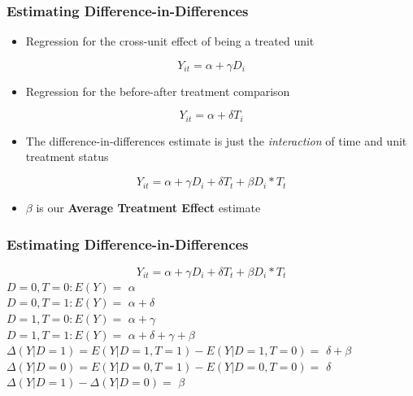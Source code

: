 \documentclass[xcolor=x11names,compress]{beamer}\usepackage[]{graphicx}\usepackage[]{color}
\renewcommand{\(}{\begin{columns}}
\renewcommand{\)}{\end{columns}}
\newcommand{\<}[1]{\begin{column}{#1}}
\renewcommand{\>}{\end{column}}
\begin{document}
\begin{frame}
\frametitle{Estimating Difference-in-Differences}
\begin{itemize}
\item Regression for the cross-unit effect of being a treated unit
\end{itemize}
$$ Y_{it} = \alpha + \gamma D_i$$
\pause
\begin{itemize}
\item Regression for the before-after treatment comparison
\end{itemize}
$$ Y_{it} = \alpha + \delta T_i$$
\pause
\begin{itemize}
\item The difference-in-differences estimate is just the \textit{interaction} of time and unit treatment status
\end{itemize}
$$ Y_{it} = \alpha + \gamma D_i + \delta T_t + \beta D_i * T_t $$
\begin{itemize}
\pause
\item $\beta$ is our \textbf{Average Treatment Effect} estimate
\end{itemize}
\end{frame}

\begin{frame}
\frametitle{Estimating Difference-in-Differences}
$$ Y_{it} = \alpha + \gamma D_i + \delta T_t + \beta D_i * T_t $$
\pause
\vspace*{10px}
$D=0, T=0: E(Y)=$ \pause $\alpha$ \\
\pause
$D=0, T=1: E(Y)=$ \pause $\alpha + \delta$ \\
\pause
$D=1, T=0: E(Y)=$ \pause $\alpha + \gamma$ \\
\pause
$D=1, T=1: E(Y)=$ \pause $\alpha + \delta + \gamma + \beta$ \\
\vspace*{20px}
\pause
$\Delta(Y|D=1) = E(Y|D=1, T=1) - E(Y|D=1, T=0) =$ \pause $ \delta + \beta$ \\
\pause
$\Delta(Y|D=0) = E(Y|D=0, T=1) - E(Y|D=0, T=0) =$ \pause $ \delta$ \\
\pause
\vspace*{20px}
$\Delta(Y|D=1) - \Delta(Y|D=0) =$ \pause $\beta$
\end{frame}
\end{document}

